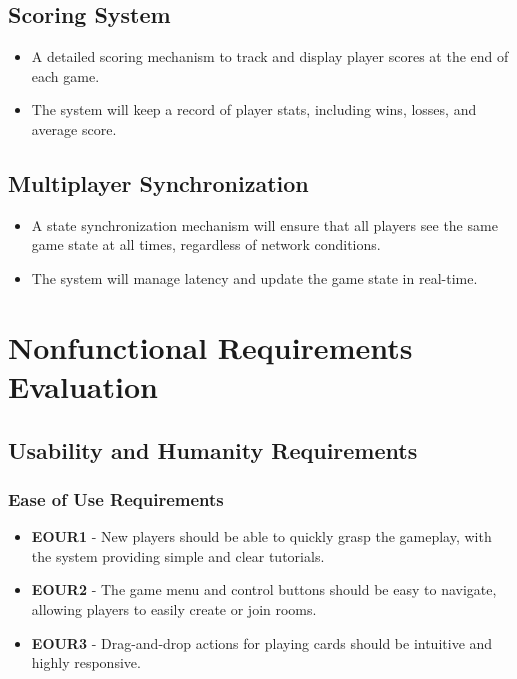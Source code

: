 \documentclass[12pt, titlepage]{article}
\begin{document}
\subsection{Scoring System}
\begin{itemize}
    \item A detailed scoring mechanism to track and display player scores at the end of each game.
    \item The system will keep a record of player stats, including wins, losses, and average score.
\end{itemize}

\subsection{Multiplayer Synchronization}
\begin{itemize}
    \item A state synchronization mechanism will ensure that all players see the same game state at all times, regardless of network conditions.
    \item The system will manage latency and update the game state in real-time.
\end{itemize}

\newpage

\section{Nonfunctional Requirements Evaluation}

\subsection{Usability and Humanity Requirements}

\subsubsection{Ease of Use Requirements}
\begin{itemize}
    \item \textbf{EOUR1} - New players should be able to quickly grasp the gameplay, with the system providing simple and clear tutorials.
    \item \textbf{EOUR2} - The game menu and control buttons should be easy to navigate, allowing players to easily create or join rooms.
    \item \textbf{EOUR3} - Drag-and-drop actions for playing cards should be intuitive and highly responsive.
\end{itemize}
\end{document}
